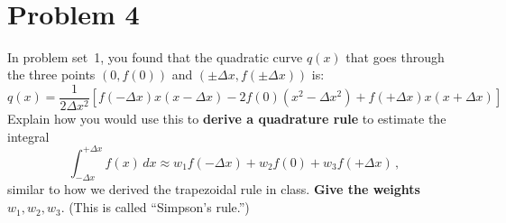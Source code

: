 \documentclass[12pt]{article}
\newcommand{\sol}[1]{}
\newcommand{\sol}[1]{{\color{red} \textbf{Solution: } #1}}
\newcommand{\newexampage}{\newpage}
\newcommand{\newexampage}{}
\begin{document}
\sol{
\begin{enumerate}
\item From class, Clenshaw--Curtis is equivalent to a trapezoidal rule with a change of variables, and hence converges like a cosine series, and that the rate of convergence of a cosine series depends on how many derivatives are smooth.   So the fastest convergence, convergence~B, should correspond to $f_1$, which looks nice and smooth; the next-fastest convergence~A should correspond to $f_2$ which has what looks like a discontinuous slope (a ``kink'') at $x = 0.75$; the slowest convergence~C should correspond to $f_3$, which has a discontinuity, the most severe non-smoothness, at $x = 0.5$.

\item Simply break the integral into two smooth pieces.  For $f_2$ you would compute $\int_0^1 f_2(x)dx = \int_0^{0.75} f_2(x)dx + \int_{0.75}^1 f_2(x)dx$, where each piece uses Clenshaw--Curtis separately.  Similarly, for $f_3$ you would split the integral at $x = 0.5$.  In both cases you would then have two smooth pieces with $\approx n/2$ points each (say), each of which gives quadrature that converges exponentially with $n/2$, and hence an overall error that converges exponentially with $n$ (similar to convergence~B for $f_1$).
\end{enumerate}
}
\newpage
$\mbox{}$
\newexampage

\section*{Problem 4}

In problem set~1, you found that the quadratic curve $q(x)$ that goes through the three points $(0,f(0))$ and $(\pm \Delta x, f(\pm \Delta x))$ is:
$$
q(x) = \frac{1}{2\Delta x^2} \left[ f(-\Delta x) x(x - \Delta x) - 2f(0) (x^2 - \Delta x^2) + f(+\Delta x) x(x+ \Delta x) \right]
$$
Explain how you would use this to \textbf{derive a quadrature rule} to estimate the integral
$$
\int_{-\Delta x}^{+\Delta x} f(x)\, dx \approx w_1 f(-\Delta x) + w_2 f(0) + w_3 f(+\Delta x) \, ,
$$
similar to how we derived the trapezoidal rule in class.  \textbf{Give the weights} $w_1,w_2,w_3$.  (This is called ``Simpson's rule.'')

\sol{We can estimate the integral by the integral of $q(x)$, just as for the trapezoidal rule we estimated the integral by integrating a piecewise-linear interpolant.  So, the three weights are just the integrals of the coefficients:
$$
w_2 = -\frac{1}{\Delta x^2}\int_{-\Delta x}^{+\Delta x} (x^2 - \Delta x^2) dx = -\frac{1}{\Delta x^2} \left. \left( \frac{x^3}{3}  - x\Delta x^2\right) \right|_{-\Delta x}^{+\Delta x} = \boxed{\frac{4}{3}\Delta x} \, ,
$$
along with
$$
w_3 = \frac{1}{2\Delta x^2}\int_{-\Delta x}^{+\Delta x} (x^2 + x\Delta x) dx = \frac{1}{2\Delta x^2} \left. \left( \frac{x^3}{3}  + \frac{x^2}{2}\Delta x^2 \right) \right|_{-\Delta x}^{+\Delta x} = \boxed{\frac{1}{3}\Delta x} \, ,
$$
with
$$
w_1 = \boxed{w_2}
$$
by symmetry (the two integrands are mirror images).
}
\end{document}
